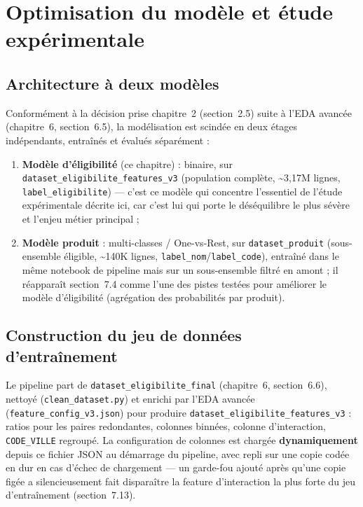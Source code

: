 \documentclass[11pt,a4paper]{report}
\begin{document}
\chapter{Optimisation du modèle et étude expérimentale}

\section{Architecture à deux modèles}
Conformément à la décision prise chapitre~2 (section~2.5) suite à l'EDA
avancée (chapitre~6, section~6.5), la modélisation est scindée en deux
étages indépendants, entraînés et évalués séparément :

\begin{enumerate}
  \item \textbf{Modèle d'éligibilité} (ce chapitre) : binaire, sur
  \texttt{dataset\_eligibilite\_features\_v3} (population complète,
  \textasciitilde 3,17M lignes, \texttt{label\_eligibilite}) — c'est ce
  modèle qui concentre l'essentiel de l'étude expérimentale décrite ici,
  car c'est lui qui porte le déséquilibre le plus sévère et l'enjeu
  métier principal ;
  \item \textbf{Modèle produit} : multi-classes / One-vs-Rest, sur
  \texttt{dataset\_produit} (sous-ensemble éligible, \textasciitilde 140K
  lignes, \texttt{label\_nom}/\texttt{label\_code}), entraîné dans le même
  notebook de pipeline mais sur un sous-ensemble filtré en amont ; il
  réapparaît section~7.4 comme l'une des pistes testées pour améliorer le
  modèle d'éligibilité (agrégation des probabilités par produit).
\end{enumerate}

\section{Construction du jeu de données d'entraînement}
Le pipeline part de \texttt{dataset\_eligibilite\_final} (chapitre~6,
section~6.6), nettoyé (\texttt{clean\_dataset.py}) et enrichi par l'EDA
avancée (\texttt{feature\_config\_v3.json}) pour produire
\texttt{dataset\_eligibilite\_features\_v3} : ratios pour les paires
redondantes, colonnes binnées, colonne d'interaction, \texttt{CODE\_VILLE}
regroupé. La configuration de colonnes est chargée \textbf{dynamiquement}
depuis ce fichier JSON au démarrage du pipeline, avec repli sur une copie
codée en dur en cas d'échec de chargement — un garde-fou ajouté après
qu'une copie figée a silencieusement fait disparaître la feature
d'interaction la plus forte du jeu d'entraînement (section~7.13).
\end{document}

